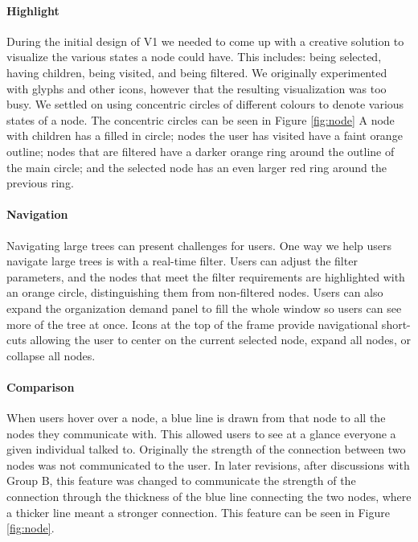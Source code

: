 \documentclass[journal]{vgtc}                %
\begin{document}
\paragraph{Highlight}
During the initial design of V1 we needed to come up with a creative solution to visualize the various states a node could have.  This includes: being selected, having children, being visited, and being filtered.  We originally experimented with glyphs and other icons, however that the resulting visualization was too busy.  We settled on using concentric circles of different colours to denote various states of a node. The concentric circles can be seen in Figure \ref{fig:node}  A node with children has a filled in circle; nodes the user has visited have a faint orange outline; nodes that are filtered have a darker orange ring around the outline of the main circle; and the selected node has an even larger red ring around the previous ring.  

\paragraph{Navigation}
Navigating large trees can present challenges for users.  One way we help users navigate large trees is with a real-time filter. Users can adjust the filter parameters, and the nodes that meet the filter requirements are highlighted with an orange circle, distinguishing them from non-filtered nodes.  Users can also expand the organization demand panel to fill the whole window so users can see more of the tree at once. Icons at the top of the frame provide navigational short-cuts allowing the user to center on the current selected node, expand all nodes, or collapse all nodes.

\paragraph{Comparison}
When users hover over a node, a blue line is drawn from that node to all the nodes they communicate with. This allowed users to see at a glance everyone a given individual talked to. Originally the strength of the connection between two nodes was not communicated to the user. In later revisions, after discussions with Group B, this feature was changed to communicate the strength of the connection through the thickness of the blue line connecting the two nodes, where a thicker line meant a stronger connection. This feature can be seen in Figure \ref{fig:node}.
\end{document}
